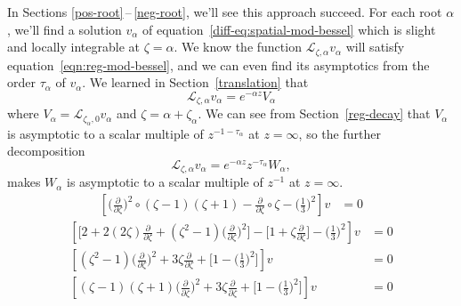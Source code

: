 \documentclass{article}
\theoremstyle{plain}
\newcommand{\laplace}{\mathcal{L}}
\newcommand{\fracderiv}[3]{\partial^{#1}_{#2, #3}}
\begin{document}
In Sections \ref{pos-root}\,--\,\ref{neg-root}, we'll see this approach succeed. For each root $\alpha$, we'll find a solution $v_\alpha$ of equation~\ref{diff-eq:spatial-mod-bessel} which is slight and locally integrable at $\zeta = \alpha$. We know the function $\laplace_{\zeta, \alpha} v_\alpha$ will satisfy equation~\ref{eqn:reg-mod-bessel}, and we can even find its asymptotics from the order $\tau_\alpha$ of $v_\alpha$. We learned in Section~\ref{translation} that
\[ \laplace_{\zeta, \alpha} v_\alpha = e^{-\alpha z} V_\alpha \]
where $V_\alpha = \laplace_{\zeta_\alpha, 0} v_\alpha$ and $\zeta = \alpha + \zeta_\alpha$. We can see from Section~\ref{reg-decay} that $V_\alpha$ is asymptotic to a scalar multiple of $z^{-1 - \tau_\alpha}$ at $z = \infty$, so the further decomposition
\[ \laplace_{\zeta, \alpha} v_\alpha = e^{-\alpha z} z^{-\tau_\alpha} W_\alpha, \]
makes $W_\alpha$ is asymptotic to a scalar multiple of $z^{-1}$ at $z = \infty$.
\color{Peru}
\begin{align*}
\left[ \big(\tfrac{\partial}{\partial \zeta}\big)^2 \circ (\zeta - 1)(\zeta + 1) - \tfrac{\partial}{\partial \zeta} \circ \zeta - \big(\tfrac{1}{3}\big)^2 \right] v & = 0
\end{align*}
\color{Sienna}
\begin{align*}
\left[ \big[ 2 + 2(2\zeta) \tfrac{\partial}{\partial \zeta} + (\zeta^2 - 1) \big(\tfrac{\partial}{\partial \zeta}\big)^2 \big] - \big[ 1 + \zeta \tfrac{\partial}{\partial \zeta} \big] - \big(\tfrac{1}{3}\big)^2 \right] v & = 0 \\
\left[ (\zeta^2 - 1) \big(\tfrac{\partial}{\partial \zeta}\big)^2 + 3\zeta \tfrac{\partial}{\partial \zeta} + \big[ 1 - \big(\tfrac{1}{3}\big)^2 \big] \right] v & = 0 \\
\left[ (\zeta - 1)(\zeta + 1) \big(\tfrac{\partial}{\partial \zeta}\big)^2 + 3\zeta \tfrac{\partial}{\partial \zeta} + \big[ 1 - \big(\tfrac{1}{3}\big)^2 \big] \right] v & = 0
\end{align*}
\color{black}
\end{document}
